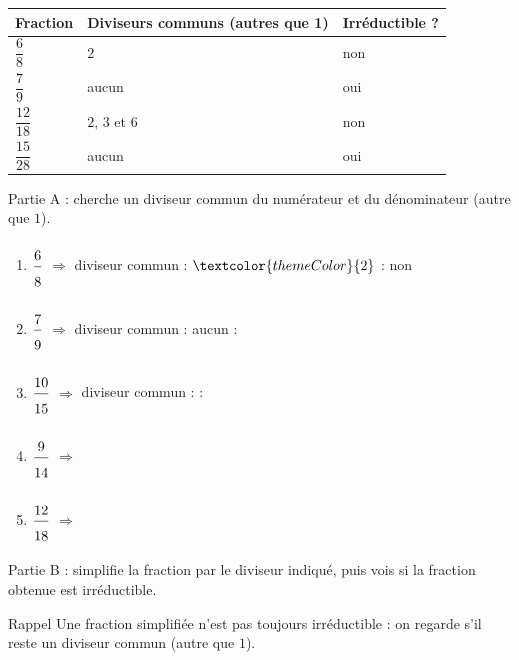 \vspace{15pt}
\def\arraystretch{3}
\begin{tabularx}{\linewidth}{|>{\centering\arraybackslash}X|>{\centering\arraybackslash}X|>{\centering\arraybackslash}X|}
\hline
\cellcolor{themeNO!30}\textbf{Fraction} & \cellcolor{themeNO!30}\textbf{Diviseurs communs (autres que 1)} & \cellcolor{themeNO!30}\textbf{Irréductible ?} \\\hline
$\dfrac{6}{8}$ & $2$ & non \\\hline
$\dfrac{7}{9}$ & aucun & oui \\\hline
$\dfrac{12}{18}$ & $2$, $3$ et $6$ & non \\\hline
$\dfrac{15}{28}$ & aucun & oui \\\hline
\end{tabularx}
\def\arraystretch{1}


\newpage


\medskip
\textcolor{themeColor}{Partie A} : cherche un diviseur commun du numérateur et du dénominateur (autre que $1$).

\begin{enumerate}[leftmargin=*,align=parleft, label=\alph*), itemsep=-4pt]
\item $\FA{6}{8}$ \quad $\Longrightarrow$ \quad diviseur commun : $\textcolor{themeColor}{2}$ \quad : \quad \textcolor{themeColor}{non}
\item $\FA{7}{9}$ \quad $\Longrightarrow$ \quad diviseur commun : \textcolor{themeColor}{aucun} \quad : \quad \Case
\item $\FA{10}{15}$ \quad $\Longrightarrow$ \quad diviseur commun : \CaseC \quad : \quad \Case
\item $\FA{9}{14}$ \quad $\Longrightarrow$
\item $\FA{12}{18}$ \quad $\Longrightarrow$
\end{enumerate}

\vfill
\textcolor{themeColor}{Partie B} : simplifie la fraction par le diviseur indiqué, puis vois si la fraction obtenue est irréductible.

\vspace{5pt}\begin{astuce}{Rappel}
Une fraction simplifiée n'est pas toujours irréductible : on regarde s'il reste un diviseur commun (autre que $1$).
\end{astuce}\vspace{10pt}

